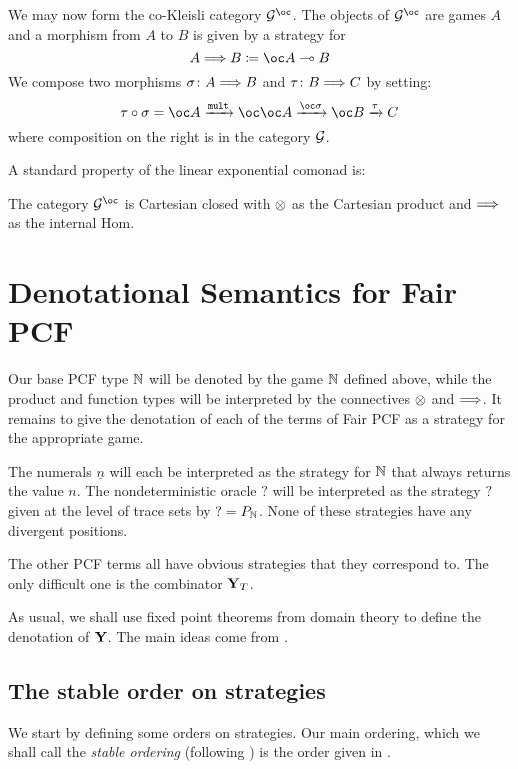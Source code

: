 \documentclass{article}
\begin{document}
We may now form the co-Kleisli category $\G^{\oc}$.  The objects of $\G^{\oc}$ are games $A$ and a morphism from $A$ to $B$ is given by a strategy for
\[
  A \iimpl B \coloneqq \oc A \implies B
  \]
We compose two morphisms $\sigma\colon A\Longrightarrow B$ and $\tau\colon B\Longrightarrow C$ by setting:
\[
  \icomp{\tau}{\sigma} = \oc A \xrightarrow{\mult} \oc \oc A \xrightarrow{\oc \sigma} \oc B \xrightarrow{\tau} C
  \]
where composition on the right is in the category $\mathcal G$.

A standard property of the linear exponential comonad is:

\begin{theorem}
  The category $\G^{\oc}$ is Cartesian closed with $\otimes$ as the Cartesian product and $\Longrightarrow$ as the internal Hom.
\end{theorem}

\section{Denotational Semantics for Fair PCF}

Our base PCF type $\mathbb{N}$ will be denoted by the game $\mathbb{N}$ defined above, while the product and function types will be interpreted by the connectives $\otimes$ and $\Longrightarrow$.  It remains to give the denotation of each of the terms of Fair PCF as a strategy for the appropriate game.

The numerals $\underline{n}$ will each be interpreted as the strategy for $\mathbb{N}$ that always returns the value $n$.  The nondeterministic oracle $?$ will be interpreted as the strategy $?$ given at the level of trace sets by $?=P_{\mathbb{N}}$.  None of these strategies have any divergent positions.

The other PCF terms all have obvious strategies that they correspond to.  The only difficult one is the combinator $\mathbf{Y}_T$.  

As usual, we shall use fixed point theorems from domain theory to define the denotation of $\mathbf{Y}$.  The main ideas come from \cite{LairdOrdinalGames}.

\subsection{The stable order on strategies}

We start by defining some orders on strategies.  Our main ordering, which we shall call the \emph{stable ordering} (following \cite{LairdOrdinalGames}) is the order given in \cite{mcCHFiniteND}.
\end{document}
